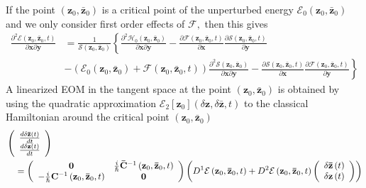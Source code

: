 \documentclass[aps,preprint]{revtex4}%
\begin{document}
If the point $\left(  \mathbf{z}_{0},\mathbf{\bar{z}}_{0}\right)  $ is a
critical point of the unperturbed energy $\mathcal{E}_{0}\left(
\mathbf{z}_{0},\mathbf{\bar{z}}_{0}\right)  $ and we only consider first order
effects of $\mathcal{F},$ then this gives
\begin{align}
\frac{\partial^{2}\mathcal{E}\left(  \mathbf{z}_{0},\mathbf{\bar{z}}%
_{0},t\right)  }{\partial\mathbf{x}\partial\mathbf{y}} &  =\frac
{1}{\mathcal{S}\left(  \mathbf{z}_{0},\mathbf{\bar{z}}_{0}\right)  }\left\{
\frac{\partial^{2}\mathcal{H}_{0}\left(  \mathbf{z}_{0},\mathbf{\bar{z}}%
_{0}\right)  }{\partial\mathbf{x}\partial\mathbf{y}}\right.  -\frac
{\partial\mathcal{F}\left(  \mathbf{z}_{0},\mathbf{\bar{z}}_{0},t\right)
}{\partial\mathbf{x}}\frac{\partial\mathcal{S}\left(  \mathbf{z}%
_{0},\mathbf{\bar{z}}_{0},t\right)  }{\partial\mathbf{y}}\nonumber\\
&  \left.  -\left(  \mathcal{E}_{0}\left(  \mathbf{z}_{0},\mathbf{\bar{z}}%
_{0}\right)  +\mathcal{F}\left(  \mathbf{z}_{0},\mathbf{\bar{z}}_{0},t\right)
\right)  \frac{\partial^{2}\mathcal{S}\left(  \mathbf{z}_{0},\mathbf{\bar{z}%
}_{0}\right)  }{\partial\mathbf{x}\partial\mathbf{y}}-\frac{\partial
\mathcal{S}\left(  \mathbf{z}_{0},\mathbf{\bar{z}}_{0},t\right)  }%
{\partial\mathbf{x}}\frac{\partial\mathcal{F}\left(  \mathbf{z}_{0}%
,\mathbf{\bar{z}}_{0},t\right)  }{\partial\mathbf{y}}\right\}
\end{align}
A linearized EOM in the tangent space at the point $\left(  \mathbf{z}%
_{0},\mathbf{\bar{z}}_{0}\right)  $ is obtained by using the quadratic
approximation $\mathcal{E}_{2}\left[  \mathbf{z}_{0}\right]  \left(
\delta\mathbf{z},\delta\mathbf{\bar{z}},t\right)  $ to the classical
Hamiltonian around the critical point $\left(  \mathbf{z}_{0},\mathbf{\bar{z}%
}_{0}\right)  $%
\begin{align}
&  \left(
\begin{array}
[c]{c}%
\frac{d\delta\mathbf{\bar{z}}\left(  t\right)  }{dt}\\
\frac{d\delta\mathbf{z}\left(  t\right)  }{dt}%
\end{array}
\right)  \nonumber\\
&  \quad=\left(
\begin{array}
[c]{cc}%
\mathbf{0} & \frac{i}{\hslash}\mathbf{\bar{C}}^{-1}\left(  \mathbf{z}%
_{0},\mathbf{\bar{z}}_{0},t\right)  \\
-\frac{i}{\hslash}\mathbf{C}^{-1}\left(  \mathbf{z}_{0},\mathbf{\bar{z}}%
_{0},t\right)   & \mathbf{0}%
\end{array}
\right)  \left(  D^{1}\mathcal{E}\left(  \mathbf{z}_{0},\mathbf{\bar{z}}%
_{0},t\right)  +D^{2}\mathcal{E}\left(  \mathbf{z}_{0},\mathbf{\bar{z}}%
_{0},t\right)  \left(
\begin{array}
[c]{c}%
\delta\mathbf{\bar{z}}\left(  t\right)  \\
\delta\mathbf{z}\left(  t\right)
\end{array}
\right)  \right)
\end{align}
\end{document}
